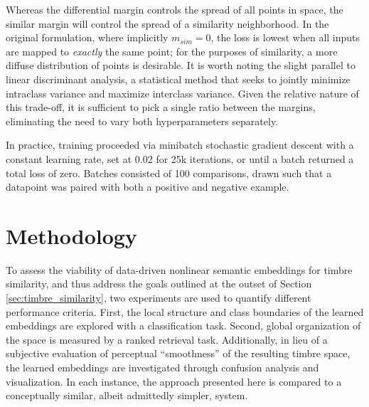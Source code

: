 
Whereas the differential margin controls the spread of all points in space, the similar margin will control the spread of a similarity neighborhood.
In the original formulation, where implicitly $m_{sim} = 0$, the loss is lowest when all inputs are mapped to \emph{exactly} the same point; for the purposes of similarity, a more diffuse distribution of points is desirable.
It is worth noting the slight parallel to linear discriminant analysis, a statistical method that seeks to jointly minimize intraclass variance and maximize interclass variance.
Given the relative nature of this trade-off, it is sufficient to pick a single ratio between the margins, eliminating the need to vary both hyperparameters separately.


In practice, training proceeded via minibatch stochastic gradient descent with a constant learning rate, set at 0.02 for 25k iterations, or until a batch returned a total loss of zero.
Batches consisted of 100 comparisons, drawn such that a datapoint was paired with both a positive and negative example.


\section{Methodology}
\label{sec:methodology}


To assess the viability of data-driven nonlinear semantic embeddings for timbre similarity, and thus address the goals outlined at the outset of Section \ref{sec:timbre_similarity}, two experiments are used to quantify different performance criteria.
First, the local structure and class boundaries of the learned embeddings are explored with a classification task.
Second, global organization of the space is measured by a ranked retrieval task.
Additionally, in lieu of a subjective evaluation of perceptual ``smoothness'' of the resulting timbre space, the learned embeddings are investigated through confusion analysis and visualization.
In each instance, the approach presented here is compared to a conceptually similar, albeit admittedly simpler, system.

